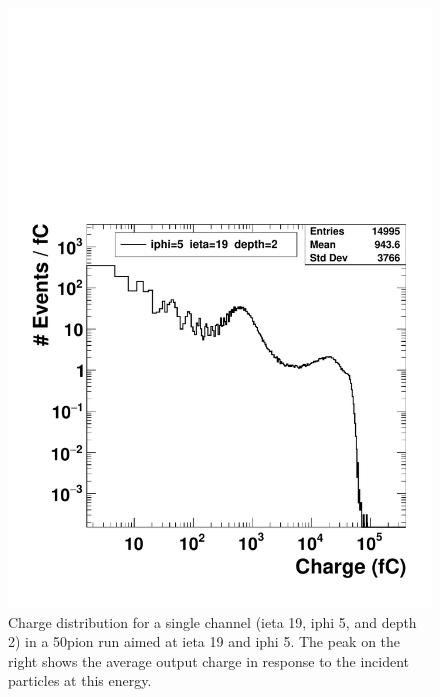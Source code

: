 \begin{figure}
\centering
\includegraphics[width=0.7\linewidth]{Figures/pioncharge.pdf}
\caption{Charge distribution for a single channel (ieta 19, iphi 5, and depth 2) in a 50\GeV\space pion run aimed at ieta 19 and iphi 5. The peak on the right shows the average output charge in response to the incident particles at this energy.}
\label{fig:pioncharge}
\end{figure}

